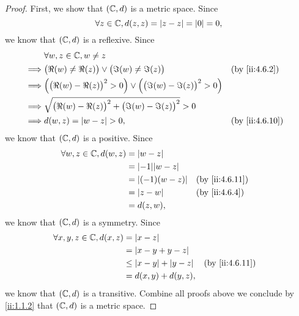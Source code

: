 \begin{proof}
  First, we show that \((\mathbb{C}, d)\) is a metric space.
  Since
  \[
    \forall z \in \mathbb{C}, d(z, z) = \left\lvert z - z\right\rvert = \left\lvert0\right\rvert = 0,
  \]
  we know that \((\mathbb{C}, d)\) is a reflexive.
  Since
  \begin{align*}
             & \forall w, z \in \C, w \neq z                                                                                \\
    \implies & \big(\Re(w) \neq \Re(z)\big) \lor \big(\Im(w) \neq \Im(z)\big)                           &  & \by{ii:4.6.2}  \\
    \implies & \Big(\big(\Re(w) - \Re(z)\big)^2 > 0\Big) \lor \Big(\big(\Im(w) - \Im(z)\big)^2 > 0\Big)                     \\
    \implies & \sqrt{\big(\Re(w) - \Re(z)\big)^2 + \big(\Im(w) - \Im(z)\big)^2} > 0                                         \\
    \implies & d(w, z) = \abs{w - z} > 0,                                                               &  & \by{ii:4.6.10}
  \end{align*}
  we know that \((\mathbb{C}, d)\) is a positive.
  Since
  \begin{align*}
    \forall w, z \in \C, d(w, z) & = \abs{w - z}                              \\
                                 & = \abs{-1} \abs{w - z}                     \\
                                 & = \abs{(-1) (w - z)}   &  & \by{ii:4.6.11} \\
                                 & = \abs{z - w}          &  & \by{ii:4.6.4}  \\
                                 & = d(z, w),
  \end{align*}
  we know that \((\mathbb{C}, d)\) is a symmetry.
  Since
  \begin{align*}
    \forall x, y, z \in \C, d(x, z) & = \abs{x - z}                                      \\
                                    & = \abs{x - y + y - z}                              \\
                                    & \leq \abs{x - y} + \abs{y - z} &  & \by{ii:4.6.11} \\
                                    & = d(x, y) + d(y, z),
  \end{align*}
  we know that \((\mathbb{C}, d)\) is a transitive.
  Combine all proofs above we conclude by \cref{ii:1.1.2} that \((\mathbb{C}, d)\) is a metric space.


\end{proof}
